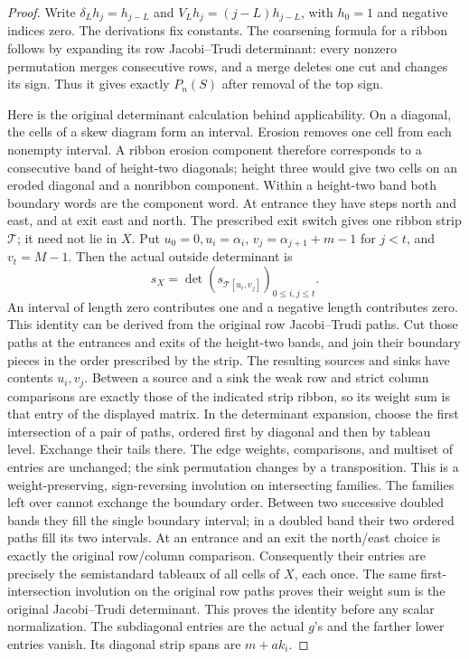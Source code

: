 \documentclass[11pt,a4paper]{amsart}
\numberwithin{equation}{section}
\theoremstyle{plain}
\theoremstyle{definition}
\begin{document}
\begin{proof}
Write \(\delta_Lh_j=h_{j-L}\) and
\(V_Lh_j=(j-L)h_{j-L}\), with \(h_0=1\) and negative indices zero.
The derivations fix constants.  The coarsening formula for a ribbon follows
by expanding its row Jacobi--Trudi determinant: every nonzero permutation
merges consecutive rows, and a merge deletes one cut and changes its sign.
Thus it gives exactly \(P_n(S)\) after removal of the top sign.

Here is the original determinant calculation behind applicability.
On a diagonal, the cells of a skew diagram form an interval.  Erosion removes
one cell from each nonempty interval.  A ribbon erosion component therefore
corresponds to a consecutive band of height-two diagonals; height three would
give two cells on an eroded diagonal and a nonribbon component.  Within a
height-two band both boundary words are the component word.  At entrance
they have steps north and east, and at exit east and north.  The prescribed
exit switch gives one ribbon strip \(\mathcal T\); it need not lie in \(X\).
Put \(u_0=0,u_i=\alpha_i\),
\(v_j=\alpha_{j+1}+m-1\) for \(j<t\), and \(v_t=M-1\).  Then the actual
outside determinant is
\begin{equation}\label{eq:oo-outside}
 s_X=\det(s_{\mathcal T[u_i,v_j]})_{0\le i,j\le t}.
\end{equation}
An interval of length zero contributes one and a negative length contributes
zero.  This identity can be derived from the original row Jacobi--Trudi
paths.  Cut those paths at the entrances and exits of the height-two bands,
and join their boundary pieces in the order prescribed by the strip.
The resulting sources and sinks have contents \(u_i,v_j\).  Between a source
and a sink the weak row and strict column comparisons are exactly those of
the indicated strip ribbon, so its weight sum is that entry of the displayed
matrix.  In the determinant expansion, choose the first intersection of a
pair of paths, ordered first by diagonal and then by tableau level.  Exchange
their tails there.  The edge weights, comparisons, and multiset of entries
are unchanged; the sink permutation changes by a transposition.  This is a
weight-preserving, sign-reversing involution on intersecting families.
The families left over cannot exchange the boundary order.  Between two
successive doubled bands they fill the single boundary interval; in a doubled
band their two ordered paths fill its two intervals.  At an entrance and an
exit the north/east choice is exactly the original row/column comparison.
Consequently their entries are precisely the semistandard tableaux of all
cells of \(X\), each once.  The same first-intersection involution on the
original row paths proves their weight sum is the original Jacobi--Trudi
determinant.  This proves the identity before any scalar normalization.
The subdiagonal entries are the actual \(g\)'s and the farther lower entries
vanish.  Its diagonal strip spans are \(m+ak_i\).


\end{proof}
\end{document}
